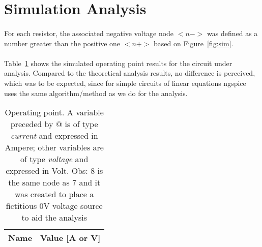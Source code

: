 \section{Simulation Analysis}
\label{sec:simulation}

\paragraph{} For each resistor, the associated negative voltage node $<n->$ was defined as a number greater than the positive one $<n+>$ based on Figure~\ref{fig:sim}.
\paragraph{} Table~\ref{tab:op} shows the simulated operating point results for the circuit under analysis. Compared to the theoretical analysis results, no difference is perceived, which was to be expected, since for simple circuits of linear equations ngspice uses the same algorithm/method as we do for the analysis.

\clearpage

\begin{table}[h]
  \centering
  \begin{tabular}{|l|r|}
    \hline    
    {\bf Name} & {\bf Value [A or V]} \\ \hline
    
  \end{tabular}
  \caption{Operating point. A variable preceded by @ is of type {\em current}
    and expressed in Ampere; other variables are of type {\it voltage} and expressed in Volt. Obs: 8 is the same node as 7 and it was created to place a fictitious 0V voltage source to aid the analysis}
  \label{tab:op}
\end{table}
